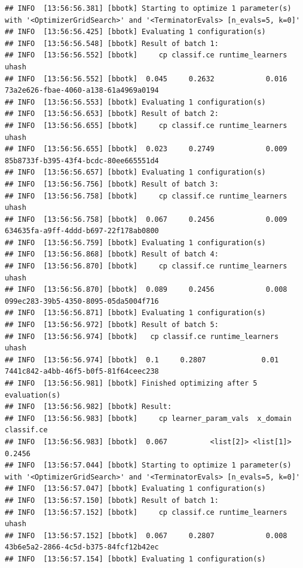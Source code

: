 \documentclass[
]{scrbook}
\begin{document}
\begin{verbatim}
## INFO  [13:56:56.381] [bbotk] Starting to optimize 1 parameter(s) with '<OptimizerGridSearch>' and '<TerminatorEvals> [n_evals=5, k=0]' 
## INFO  [13:56:56.425] [bbotk] Evaluating 1 configuration(s) 
## INFO  [13:56:56.548] [bbotk] Result of batch 1: 
## INFO  [13:56:56.552] [bbotk]     cp classif.ce runtime_learners                                uhash 
## INFO  [13:56:56.552] [bbotk]  0.045     0.2632            0.016 73a2e626-fbae-4060-a138-61a4969a0194 
## INFO  [13:56:56.553] [bbotk] Evaluating 1 configuration(s) 
## INFO  [13:56:56.653] [bbotk] Result of batch 2: 
## INFO  [13:56:56.655] [bbotk]     cp classif.ce runtime_learners                                uhash 
## INFO  [13:56:56.655] [bbotk]  0.023     0.2749            0.009 85b8733f-b395-43f4-bcdc-80ee665551d4 
## INFO  [13:56:56.657] [bbotk] Evaluating 1 configuration(s) 
## INFO  [13:56:56.756] [bbotk] Result of batch 3: 
## INFO  [13:56:56.758] [bbotk]     cp classif.ce runtime_learners                                uhash 
## INFO  [13:56:56.758] [bbotk]  0.067     0.2456            0.009 634635fa-a9ff-4ddd-b697-22f178ab0800 
## INFO  [13:56:56.759] [bbotk] Evaluating 1 configuration(s) 
## INFO  [13:56:56.868] [bbotk] Result of batch 4: 
## INFO  [13:56:56.870] [bbotk]     cp classif.ce runtime_learners                                uhash 
## INFO  [13:56:56.870] [bbotk]  0.089     0.2456            0.008 099ec283-39b5-4350-8095-05da5004f716 
## INFO  [13:56:56.871] [bbotk] Evaluating 1 configuration(s) 
## INFO  [13:56:56.972] [bbotk] Result of batch 5: 
## INFO  [13:56:56.974] [bbotk]   cp classif.ce runtime_learners                                uhash 
## INFO  [13:56:56.974] [bbotk]  0.1     0.2807             0.01 7441c842-a4bb-46f5-b0f5-81f64ceec238 
## INFO  [13:56:56.981] [bbotk] Finished optimizing after 5 evaluation(s) 
## INFO  [13:56:56.982] [bbotk] Result: 
## INFO  [13:56:56.983] [bbotk]     cp learner_param_vals  x_domain classif.ce 
## INFO  [13:56:56.983] [bbotk]  0.067          <list[2]> <list[1]>     0.2456 
## INFO  [13:56:57.044] [bbotk] Starting to optimize 1 parameter(s) with '<OptimizerGridSearch>' and '<TerminatorEvals> [n_evals=5, k=0]' 
## INFO  [13:56:57.047] [bbotk] Evaluating 1 configuration(s) 
## INFO  [13:56:57.150] [bbotk] Result of batch 1: 
## INFO  [13:56:57.152] [bbotk]     cp classif.ce runtime_learners                                uhash 
## INFO  [13:56:57.152] [bbotk]  0.067     0.2807            0.008 43b6e5a2-2866-4c5d-b375-84fcf12b42ec 
## INFO  [13:56:57.154] [bbotk] Evaluating 1 configuration(s) 

\end{verbatim}
\end{document}
